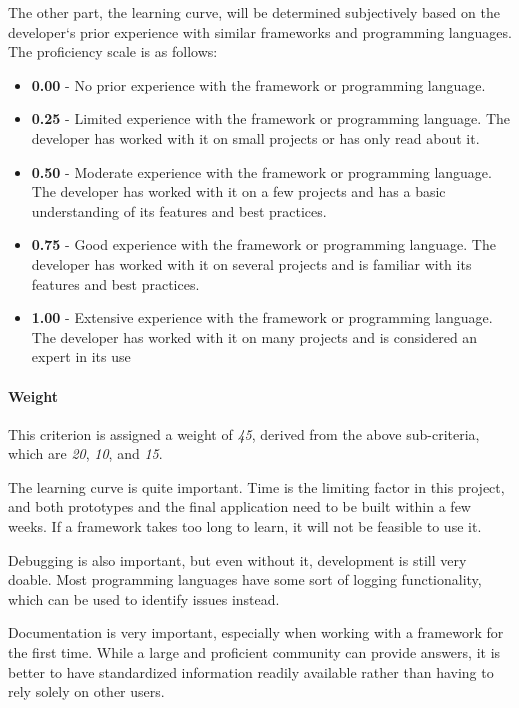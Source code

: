 The other part, the learning curve, will be determined subjectively based on the developer`s prior experience with similar frameworks and programming languages.
The proficiency scale is as follows:

\begin{itemize}
	\item \textbf{0.00} - No prior experience with the framework or programming language.
	\item \textbf{0.25} - Limited experience with the framework or programming language.
	      The developer has worked with it on small projects or has only read about it.
	\item \textbf{0.50} - Moderate experience with the framework or programming language.
	      The developer has worked with it on a few projects and has a basic understanding of its features and best practices.
	\item \textbf{0.75} - Good experience with the framework or programming language.
	      The developer has worked with it on several projects and is familiar with its features and best practices.
	\item \textbf{1.00} - Extensive experience with the framework or programming language.
	      The developer has worked with it on many projects and is considered an expert in its use
\end{itemize}

\paragraph{Weight}
This criterion is assigned a weight of \emph{45}, derived from the above sub-criteria, which are \emph{20}, \emph{10}, and \emph{15}.

The learning curve is quite important.
Time is the limiting factor in this project, and both prototypes and the final application need to be built within a few weeks.
If a framework takes too long to learn, it will not be feasible to use it.

Debugging is also important, but even without it, development is still very doable.
Most programming languages have some sort of logging functionality, which can be used to identify issues instead.

Documentation is very important, especially when working with a framework for the first time.
While a large and proficient community can provide answers, it is better to have standardized information readily available rather than having to rely solely on other users.

